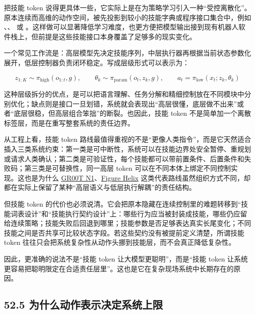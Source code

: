 把技能 token 说得更具体一些，它实际上是在为策略学习引入一种“受控离散化”。原本连续而高维的动作空间，被先投影到较小的技能字典或程序接口集合中，例如 \texttt{}、\texttt{}、\texttt{} 或 \texttt{}。这样做可以显著降低学习难度，也更方便把模型输出接到现有机器人软件栈上，但前提是这些技能接口本身覆盖了足够多的现实变化。

一个常见工作流是：高层模型先决定技能序列，中层执行器再根据当前状态参数化展开，低层控制器负责闭环稳定。写成层级形式可以表示为：

\begingroup
\scriptsize
\begin{equation*}
z_{1:K} \sim \pi_{\text{high}}(o_{1:t}, g), \qquad
\theta_k \sim \pi_{\text{param}}(o_t, z_k, g), \qquad
a_t = \pi_{\text{low}}(x_t; z_k, \theta_k)
\end{equation*}
\endgroup

这种层级拆分的优点，是可以把语言理解、任务分解和精细控制放在不同模块中分别优化；缺点则是接口一旦划错，系统就会表现出“高层很懂，底层做不出来”或者“底层很稳，但高层组合笨拙”的断裂。也因此，技能 token 不是简单加一个离散标签层，而是在重写整套系统的责任边界。

从工程上看，技能 token 路线最值得重视的不是“更像人类指令”，而是它天然适合插入三类系统约束：第一类是可中断性，系统可以在技能边界处安全暂停、重规划或请求人类确认；第二类是可验证性，每个技能都可以带前置条件、后置条件和失败码；第三类是可替换性，同一高层 token 可以在不同本体上绑定不同控制实现。这也是为什么 \href{https://arxiv.org/abs/2503.14734}{GR00T N1}、\href{https://www.figure.ai/news/helix}{Figure Helix} 这类代表路线虽然组织方式不同，却都在实际上保留了某种“高层语义与低层执行解耦”的责任结构。

但技能 token 的代价也必须说清。它会把原本隐藏在连续控制里的难题转移到“技能词表设计”和“技能执行契约设计”上：哪些行为应当被封装成技能，哪些仍应留给连续策略；技能失败后回退到哪里；技能参数是否足够表达真实长尾变化；不同技能之间是否共享可比较状态字段。若这些契约没有被提前定义清楚，所谓技能 token 往往只会把系统复杂性从动作头挪到技能层，而不会真正降低复杂性。

因此，更准确的说法不是“技能 token 让大模型更聪明”，而是“技能 token 让系统更容易把聪明限定在合适责任层里”。这也是它在复杂现场系统中长期存在的原因。

\subsection*{52.5 为什么动作表示决定系统上限}


